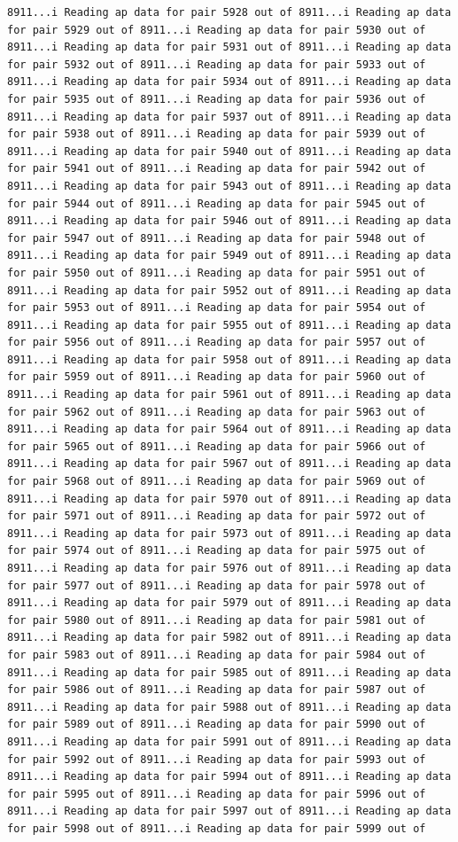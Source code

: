 \documentclass[
]{article}
\begin{document}
\begin{verbatim}
8911...i Reading ap data for pair 5928 out of 8911...i Reading ap data for pair 5929 out of 8911...i Reading ap data for pair 5930 out of 8911...i Reading ap data for pair 5931 out of 8911...i Reading ap data for pair 5932 out of 8911...i Reading ap data for pair 5933 out of 8911...i Reading ap data for pair 5934 out of 8911...i Reading ap data for pair 5935 out of 8911...i Reading ap data for pair 5936 out of 8911...i Reading ap data for pair 5937 out of 8911...i Reading ap data for pair 5938 out of 8911...i Reading ap data for pair 5939 out of 8911...i Reading ap data for pair 5940 out of 8911...i Reading ap data for pair 5941 out of 8911...i Reading ap data for pair 5942 out of 8911...i Reading ap data for pair 5943 out of 8911...i Reading ap data for pair 5944 out of 8911...i Reading ap data for pair 5945 out of 8911...i Reading ap data for pair 5946 out of 8911...i Reading ap data for pair 5947 out of 8911...i Reading ap data for pair 5948 out of 8911...i Reading ap data for pair 5949 out of 8911...i Reading ap data for pair 5950 out of 8911...i Reading ap data for pair 5951 out of 8911...i Reading ap data for pair 5952 out of 8911...i Reading ap data for pair 5953 out of 8911...i Reading ap data for pair 5954 out of 8911...i Reading ap data for pair 5955 out of 8911...i Reading ap data for pair 5956 out of 8911...i Reading ap data for pair 5957 out of 8911...i Reading ap data for pair 5958 out of 8911...i Reading ap data for pair 5959 out of 8911...i Reading ap data for pair 5960 out of 8911...i Reading ap data for pair 5961 out of 8911...i Reading ap data for pair 5962 out of 8911...i Reading ap data for pair 5963 out of 8911...i Reading ap data for pair 5964 out of 8911...i Reading ap data for pair 5965 out of 8911...i Reading ap data for pair 5966 out of 8911...i Reading ap data for pair 5967 out of 8911...i Reading ap data for pair 5968 out of 8911...i Reading ap data for pair 5969 out of 8911...i Reading ap data for pair 5970 out of 8911...i Reading ap data for pair 5971 out of 8911...i Reading ap data for pair 5972 out of 8911...i Reading ap data for pair 5973 out of 8911...i Reading ap data for pair 5974 out of 8911...i Reading ap data for pair 5975 out of 8911...i Reading ap data for pair 5976 out of 8911...i Reading ap data for pair 5977 out of 8911...i Reading ap data for pair 5978 out of 8911...i Reading ap data for pair 5979 out of 8911...i Reading ap data for pair 5980 out of 8911...i Reading ap data for pair 5981 out of 8911...i Reading ap data for pair 5982 out of 8911...i Reading ap data for pair 5983 out of 8911...i Reading ap data for pair 5984 out of 8911...i Reading ap data for pair 5985 out of 8911...i Reading ap data for pair 5986 out of 8911...i Reading ap data for pair 5987 out of 8911...i Reading ap data for pair 5988 out of 8911...i Reading ap data for pair 5989 out of 8911...i Reading ap data for pair 5990 out of 8911...i Reading ap data for pair 5991 out of 8911...i Reading ap data for pair 5992 out of 8911...i Reading ap data for pair 5993 out of 8911...i Reading ap data for pair 5994 out of 8911...i Reading ap data for pair 5995 out of 8911...i Reading ap data for pair 5996 out of 8911...i Reading ap data for pair 5997 out of 8911...i Reading ap data for pair 5998 out of 8911...i Reading ap data for pair 5999 out of 
\end{verbatim}
\end{document}
